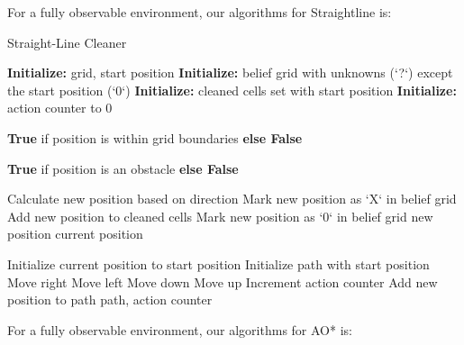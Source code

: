 \documentclass{article}
\begin{document}
For a fully observable environment, our algorithms for Straightline is:
\begin{algorithm}[h]
  \caption{Straight-Line Cleaner}
  \begin{algorithmic}[1]
  \State \textbf{Initialize:} grid, start position
  \State \textbf{Initialize:} belief grid with unknowns (`?`) except the start position (`0`)
  \State \textbf{Initialize:} cleaned cells set with start position
  \State \textbf{Initialize:} action counter to 0
  
      \State \Return \textbf{True} if position is within grid boundaries \textbf{else False}
  \EndFunction
  
      \State \Return \textbf{True} if position is an obstacle \textbf{else False}
  \EndFunction
  
      \State Calculate new position based on direction
              \State Mark new position as `X` in belief grid
          \Else
              \State Add new position to cleaned cells
              \State Mark new position as `0` in belief grid
          \EndIf
          \State \Return new position
      \EndIf
      \State \Return current position
  \EndFunction
  
      \State Initialize current position to start position
      \State Initialize path with start position
                      \State Move right
                      \State Move left
                      \State Move down
                      \State Move up
                  \EndIf
                  \State Increment action counter
                  \State Add new position to path
              \EndWhile
          \EndIf
      \EndFor
      \State \Return path, action counter
  \EndFunction
  \end{algorithmic}
  \end{algorithm}

 

  \pagebreak
For a fully observable environment, our algorithms for AO* is:
\end{document}
